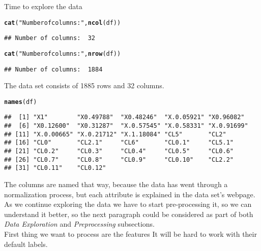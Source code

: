 \documentclass{article}\usepackage[]{graphicx}\usepackage[]{color}
\makeatletter
\newcommand{\hlstr}[1]{\textcolor[rgb]{0.192,0.494,0.8}{#1}}%
\newcommand{\hlstd}[1]{\textcolor[rgb]{0.345,0.345,0.345}{#1}}%
\newcommand{\hlkwd}[1]{\textcolor[rgb]{0.737,0.353,0.396}{\textbf{#1}}}%
\newenvironment{kframe}{%
 \def\at@end@of@kframe{}%
 \ifinner\ifhmode%
  \def\at@end@of@kframe{\end{minipage}}%
  \begin{minipage}{\columnwidth}%
 \fi\fi%
 \def\FrameCommand##1{\hskip\@totalleftmargin \hskip-\fboxsep
 \colorbox{shadecolor}{##1}\hskip-\fboxsep
     \hskip-\linewidth \hskip-\@totalleftmargin \hskip\columnwidth}%
 \MakeFramed {\advance\hsize-\width
   \@totalleftmargin\z@ \linewidth\hsize
   \@setminipage}}%
 {\par\unskip\endMakeFramed%
 \at@end@of@kframe}
\newenvironment{knitrout}{}{} %
\makeatother
\begin{document}
Time to explore the data
\begin{knitrout}
\color{fgcolor}\begin{kframe}
\begin{alltt}
\hlkwd{cat}\hlstd{(}\hlstr{"Number of columns: "}\hlstd{,} \hlkwd{ncol}\hlstd{(df))}
\end{alltt}
\begin{verbatim}
## Number of columns:  32
\end{verbatim}
\begin{alltt}
\hlkwd{cat}\hlstd{(}\hlstr{"Number of columns: "}\hlstd{,} \hlkwd{nrow}\hlstd{(df))}
\end{alltt}
\begin{verbatim}
## Number of columns:  1884
\end{verbatim}
\end{kframe}
\end{knitrout}

The data set consists of 1885 rows and 32 columns. 

\begin{knitrout}
\color{fgcolor}\begin{kframe}
\begin{alltt}
\hlkwd{names}\hlstd{(df)}
\end{alltt}
\begin{verbatim}
##  [1] "X1"        "X0.49788"  "X0.48246"  "X.0.05921" "X0.96082" 
##  [6] "X0.12600"  "X0.31287"  "X.0.57545" "X.0.58331" "X.0.91699"
## [11] "X.0.00665" "X.0.21712" "X.1.18084" "CL5"       "CL2"      
## [16] "CL0"       "CL2.1"     "CL6"       "CL0.1"     "CL5.1"    
## [21] "CL0.2"     "CL0.3"     "CL0.4"     "CL0.5"     "CL0.6"    
## [26] "CL0.7"     "CL0.8"     "CL0.9"     "CL0.10"    "CL2.2"    
## [31] "CL0.11"    "CL0.12"
\end{verbatim}
\end{kframe}
\end{knitrout}

The columns are named that way, because the data has went through a normalization process, but each attribute is explained in the data set's webpage. \\

As we continue exploring the data we have to start pre-processing it, so we can understand it better, so the next paragraph could be considered as part of both \textit{Data Exploration} and \textit{Preprocessing} subsections.
\\
First thing we want to process are the features It will be hard to work with their default labels.
\end{document}
